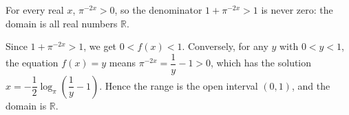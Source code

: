 For every real $x$, $\pi^{-2x}>0$, so the denominator $1+\pi^{-2x}>1$ is never zero: the domain is all real numbers $\mathbb R$.

Since $1+\pi^{-2x}>1$, we get $0<f(x)<1$. Conversely, for any $y$ with $0<y<1$, the equation $f(x)=y$ means $\pi^{-2x}=\dfrac1y-1>0$, which has the solution $x=-\dfrac12\log_\pi\left(\dfrac1y-1\right)$. Hence the range is the open interval $\boxed{(0,1)}$, and the domain is $\boxed{\mathbb R}$.
